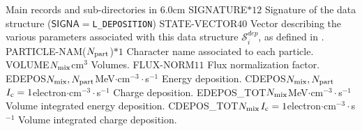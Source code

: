 \begin{DescriptionEnregistrement}{Main records and sub-directories in }{6.0cm}
\CharEnr
  {SIGNATURE}{$*12$}
  {Signature of the data structure ($\mathsf{SIGNA}=${\tt L\_DEPOSITION})}
\IntEnr
  {STATE-VECTOR}{$40$}
  {Vector describing the various parameters associated with this data structure $\mathcal{S}^{dep}_{i}$,
  as defined in .}
\CharEnr
  {PARTICLE-NAM}{($N_{\rm part}$)$*1$}
  {Character name associated to each particle.}
\RealEnr
  {VOLUME}{$N_{\rm mix}$}{cm$^{3}$}
  {Volumes.}
\DbleEnr
  {FLUX-NORM}{$1$}{$1$}
  {Flux normalization factor.}
\DbleEnr
  {EDEPOS}{$N_{\rm mix},N_{\rm part}$}{MeV$\cdot$cm$^{-3}\cdot$s$^{-1}$}
  {Energy deposition.}
\OptDbleEnr
  {CDEPOS}{$N_{\rm mix},N_{\rm part}$}{$I_{\rm c} = 1$}{electron$\cdot$cm$^{-3}\cdot$s$^{-1}$}
  {Charge deposition.}
\DbleEnr
  {EDEPOS\_TOT}{$N_{\rm mix}$}{MeV$\cdot$cm$^{-3}\cdot$s$^{-1}$}
  {Volume integrated energy deposition.}
\OptDbleEnr
  {CDEPOS\_TOT}{$N_{\rm mix}$}{$I_{\rm c} = 1$}{electron$\cdot$cm$^{-3}\cdot$s$^{-1}$}
  {Volume integrated charge deposition.}
\end{DescriptionEnregistrement}

\eject
